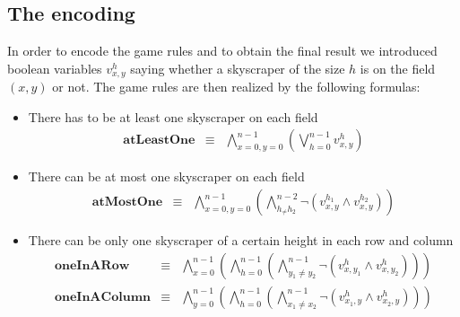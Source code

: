 \documentclass[a4paper, 12pt, titlepage]{article}
\begin{document}
\subsection{The encoding}
In order to encode the game rules and to obtain the final result we introduced boolean variables $v_{x,y}^h$ saying whether a skyscraper of the size $h$ is on the field $(x,y)$ or not. The game rules are then realized by the following formulas:
	\begin{itemize}
		\item There has to be at least one skyscraper on each field
			\begin{eqnarray}
				\pmb{atLeastOne}&\equiv&\bigwedge_{x=0,y=0}^{n-1} \left(\bigvee_{h=0}^{n-1} v_{x,y}^h \right)
			\end{eqnarray}
		\item There can be at most one skyscraper on each field
			\begin{eqnarray}
				\pmb{atMostOne}&\equiv&\bigwedge_{x=0,y=0}^{n-1} \left( \bigwedge_{h_\not=h_2}^{n-2}\neg(v_{x,y}^{h_1} \wedge v_{x,y}^{h_2})  \right)
			\end{eqnarray}
		\item There can be only one skyscraper of a certain height in each row and column
			\begin{eqnarray}
				\pmb{oneInARow} &\equiv& \bigwedge_{x=0}^{n-1} \left( \bigwedge_{h=0}^{n-1} \left( \bigwedge_{y_1 \not = y_2}^{n-1} \neg(v_{x,y_1}^h \wedge v_{x,y_2}^h) \right) \right) \\
				\pmb{oneInAColumn} &\equiv&  \bigwedge_{y=0}^{n-1} \left( \bigwedge_{h=0}^{n-1} \left( \bigwedge_{x_1 \not = x_2}^{n-1} \neg(v_{x_1,y}^h \wedge v_{x_2,y}^h) \right) \right)
			\end{eqnarray}
	\end{itemize}
\end{document}
